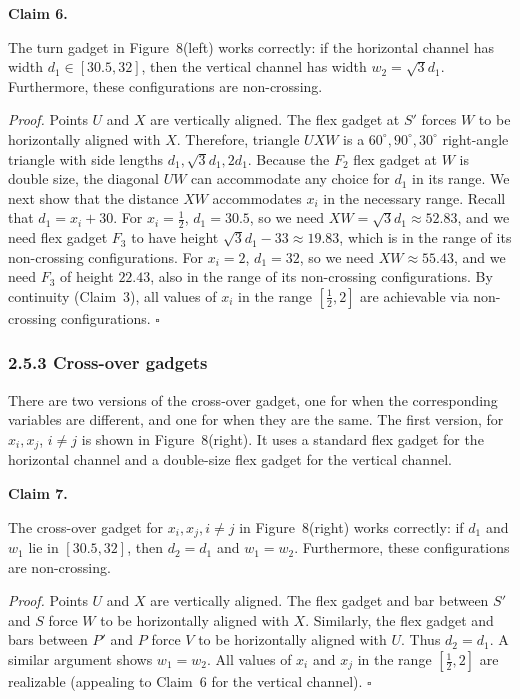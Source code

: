 \documentclass{article}
\begin{document}
\par\medskip\noindent\textbf{Claim 6.} \begin{itshape} 

The turn gadget in Figure~8(left) works correctly:
if 
the horizontal channel has width $d_1 \in [30.5,32]$, then the vertical channel has width $w_2 =  \sqrt{3}d_1$.  Furthermore, these configurations are non-crossing.
\end{itshape}\par\medskip
\par\noindent\textit{Proof.} 
Points $U$ and $X$ are vertically aligned.  
The flex gadget at $S'$ forces $W$ to be horizontally aligned with $X$.  
Therefore, triangle $UXW$ is a $60^\circ,90^\circ,30^\circ$ right-angle triangle with side lengths $d_1, \sqrt{3} d_1, 2d_1$.  Because the $F_2$ flex gadget at $W$ is double size, the diagonal $UW$ can accommodate any choice for $d_1$ in its range. We next show that the distance $XW$ accommodates $x_i$ in the necessary range. 
Recall that $d_1 = x_i + 30$. 
For $x_i= \frac{1}{2}$, $d_1 = 30.5$, so we need $XW = \sqrt{3}d_1 \approx 52.83$, and we need flex gadget $F_3$ to have height $\sqrt{3}d_1 - 33 \approx 19.83$, which is in the  range of its non-crossing configurations.
For $x_i=2$, $d_1 = 32$, so we need $XW \approx 55.43$, and we need $F_3$ of height $22.43$, also in the range of its non-crossing configurations.
By continuity (Claim~3), all values of $x_i$ in the range $[\frac{1}{2},2]$ are achievable via non-crossing configurations.    
\hfill$\square$\par\medskip

\subsubsection*{2.5.3 Cross-over gadgets}
There are two versions of the cross-over gadget, one for when the corresponding variables are different, and one for when they are the same. 
The first version, for $x_i, x_j$, $i \ne j$ is shown in 
Figure~8(right).  It uses a standard flex gadget for the horizontal channel and a double-size flex gadget for the vertical channel.

\par\medskip\noindent\textbf{Claim 7.} \begin{itshape}

The cross-over gadget for $x_i, x_j, i \ne j$ in Figure~8(right)  works correctly: if $d_1$ and $w_1$ lie in  $[30.5,32]$, then $d_2=d_1$ and $w_1=w_2$.  Furthermore, these configurations are non-crossing.  
\end{itshape}\par\medskip
\par\noindent\textit{Proof.}  
Points $U$ and $X$ are vertically aligned.  
The flex gadget and bar between $S'$ and $S$ force $W$ to be horizontally aligned with $X$.  Similarly, the flex gadget and bars between $P'$ and $P$ force $V$ to be horizontally aligned with $U$.  Thus $d_2 = d_1$.  A similar argument shows $w_1 = w_2$.  All values of $x_i$ and $x_j$ in the range $[\frac{1}{2},2]$ are realizable (appealing to Claim~6 for the vertical channel).
\hfill$\square$\par\medskip
\end{document}
